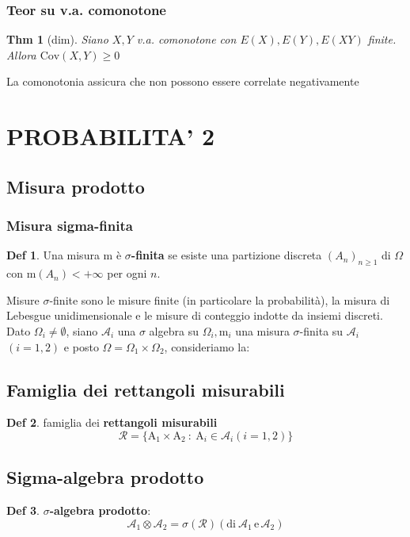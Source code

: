 \documentclass[a4paper,11pt]{article}
\theoremstyle{plain}
\newtheorem{thm}{Thm}[section]
\theoremstyle{definition}
\newtheorem{defn}{Def}[section]
\theoremstyle{remark}
\begin{document}
\subsubsection{Teor su v.a. comonotone}
\begin{thm}[dim]
Siano $X,Y$ v.a. comonotone con $E(X),E(Y), E(XY)$ finite. Allora $\mathrm{Cov}(X,Y)\geq0$
\end{thm}

\noindent
La comonotonia assicura che non possono essere correlate negativamente 

\newpage
\section{PROBABILITA' 2}
\subsection{Misura prodotto}
\subsubsection{Misura sigma-finita}
\begin{defn}
Una misura $\mathrm{m}$ è $\sigma$\textbf{-finita} se esiste una partizione discreta $(A_{n})_{n\geq 1}$ di $\Omega$ con $\mathrm{m}(A_{n})<+\infty$ per ogni $n.$
\end{defn}

\noindent
 Misure $\sigma$-finite sono le misure finite (in particolare la probabilità), la misura di Lebesgue unidimensionale e  le misure di conteggio indotte da insiemi discreti.\\
 
 
\noindent
 Dato $\Omega_{i}\neq\emptyset$, siano $\mathcal{A}_{i}$ una $\sigma$ algebra su $\Omega_{i}, \mathrm{m}_{i}$ una misura $\sigma$-finita su $\mathcal{A}_{i}$ $(i=1,2)$ e posto $\Omega=\Omega_{1}\times\Omega_{2}$, consideriamo la:
 
 \subsection{Famiglia dei rettangoli misurabili}
 \begin{defn} famiglia dei \textbf{rettangoli misurabili}
 $$
 \mathcal{R}=\{\mathrm{A}_{1}\times \mathrm{A}_{2}\ :\ \mathrm{A}_{i}\in \mathcal{A}_{i}(i=1,2)\}
 $$
 \end{defn}
 
 \subsection{Sigma-algebra prodotto}
 \begin{defn} $\sigma$\textbf{-algebra prodotto}: 
 $$
 \mathcal{A}_{1}\otimes \mathcal{A}_{2}=\sigma(\mathcal{R}) (\mathrm{d}\mathrm{i}\ \mathcal{A}_{1}\, \mathrm{e} \, \mathcal{A}_{2})
 $$
\end{defn}
 
\end{document}
